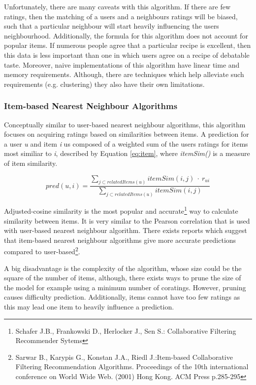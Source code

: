 Unfortunately, there are many caveats with this algorithm. If there are few ratings, then the matching of a users and a neighbours ratings will be biased, such that a particular neighbour will start heavily influencing the users neighbourhood. Additionally, the formula for this algorithm does not account for popular items. If numerous people agree that a particular recipe is excellent, then this data is less important than one in which users agree on a recipe of debatable taste. Moreover, naive implementations of this algorithm have linear time and memory requirements. Although, there are techniques which help alleviate such requirements (e.g. clustering) they also have their own limitations.

\subsubsection{Item-based Nearest Neighbour Algorithms}

Conceptually similar to user-based nearest neighbour algorithms, this algorithm focuses on acquiring ratings based on similarities between items. A prediction for a user \emph{u} and item \emph{i} us composed of a weighted sum of the users ratings for items most similiar to \emph{i}, described by Equation \ref{eq:item}, where \emph{itemSim()} is a measure of item similarity.

\begin{equation}\label{eq:item}
pred(u,i) = \frac{\sum_{j\subset relatedItems(u)} itemSim(i,j)~\cdot~r_{ui}}{\sum_{j\subset relatedItems(u)}itemSim(i,j)}
\end{equation}

Adjusted-cosine similarity is the most popular and accurate\footnote{Schafer J.B., Frankowski D., Herlocker J., Sen S.: Collaborative Filtering Recommender Sytems} way to calculate similarity between items. It is very similar to the Pearson correlation that is used with user-based nearest neighbour algorithm. There exists reports which suggest that item-based nearest neighbour algorithms give more accurate predictions compared to user-based\footnote{Sarwar B., Karypis G., Konstan J.A., Riedl J.:Item-based Collaborative Filtering Recommendation Algorithms. Proceedings of the 10th international conference on World Wide Web. (2001) Hong Kong. ACM Press p.285-295}.


A big disadvantage is the complexity of the algorithm, whose size could be the square of the number of items, although, there exists ways to prune the size of the model for example using a minimum number of coratings. However, pruning causes difficulty prediction. Additionally, items cannot have too few ratings as this may lead one item to heavily influence a prediction.

